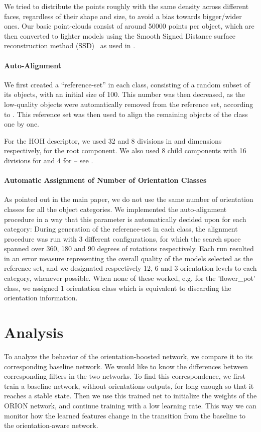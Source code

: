\documentclass{bmvc2k}
\begin{document}
We tried to distribute the points roughly with the same density across different faces, regardless of their shape and size, to avoid a bias towards bigger/wider ones.
Our basic point-clouds consist of around 50000 points per object, which are then converted to lighter models using the Smooth Signed Distance surface reconstruction method (SSD)~\cite{calakli2011ssd} as used in \cite{Sedaghat2015}.


\paragraph{Auto-Alignment}
We first created a ``reference-set'' in each class, consisting of a random subset of its objects, with an initial size of 100. This number was then decreased, as the low-quality objects were automatically removed from the reference set, according to \cite{Sedaghat2015}.
This reference set was then used to align the remaining objects of the class one by one.

For the HOH descriptor, we used 32 and 8 divisions in  and  dimensions respectively, for the root component. We also used 8 child components with 16 divisions for  and 4 for  -- see \cite{Sedaghat2015}.

\paragraph{Automatic Assignment of Number of Orientation Classes}
As pointed out in the main paper, we do not use the same number of orientation classes for all the object categories. We implemented the auto-alignment procedure in a way that this parameter is automatically decided upon for each category: During generation of the reference-set in each class, the alignment procedure was run with 3 different configurations, for which the search space spanned over 360, 180 and 90 degrees of rotations respectively. 
Each run resulted in an error measure representing the overall quality of the models selected as the reference-set, and we designated respectively 12, 6 and 3 orientation levels to each category, whenever possible. When none of these worked, e.g. for the 'flower_pot' class, we assigned 1 orientation class which is equivalent to discarding the orientation information.

\section{Analysis}
To analyze the behavior of the orientation-boosted network, we compare it to its corresponding baseline network. We would like to know the differences between corresponding filters in the two networks. To find this correspondence, we first train a baseline network, without orientations outputs, for long enough so that it reaches a stable state. Then we use this trained net to initialize the weights of the ORION network, and continue training with a low learning rate. This way we can monitor how the learned features change in the transition from the baseline to the orientation-aware network.
\end{document}

